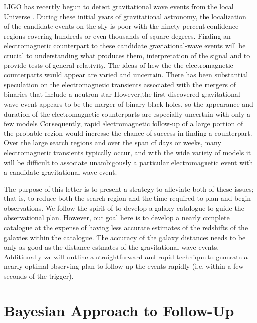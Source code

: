 \documentclass[useAMS,usenatbib]{mn2e}
\begin{document}
LIGO has recently begun to detect gravitational wave events from the
local Universe \citep{PhysRevLett.116.061102}.  During these initial
years of gravitational astronomy, the localization of the candidate
events on the sky is poor with the ninety-percent confidence regions
covering hundreds or even thousands of square degrees.  Finding an
electromagnetic counterpart to these candidate graviational-wave
events will be crucial to understanding what produces them,
interpretation of the signal and to provide tests of general
relativity.  The ideas of how the the electromagnetic counterparts
would appear are varied and uncertain. There has been substantial
speculation on the electromagnetic transients associated with the
mergers of binaries that include a neutron star
\citep[e.g.][]{2016PhRvD..93b4011E,2016arXiv160107711K,2016arXiv160100017D,2015arXiv151205435F,2015ApJ...814L..20M,2015PhRvD..92d4028K,2015arXiv150807939S,2015arXiv150807911S}
However,the first discovered gravitational wave event appears to be
the merger of binary black holes, so the appearance and duration of
the electromagnetic counterparts are especially uncertain with only a few models
\citep[e.g.][]{2015PhRvL.115n1102G,2015MNRAS.452.3419M,2016MNRAS.457..939C,2016ApJ...817..183Y}
Consequently, rapid electromagnetic follow-up of a large portion of
the probable region would increase the chance of success in finding a
counterpart.  Over the large search regions and over the span of days
or weeks, many electromagnetic transients typically occur, and with
the wide variety of models it will be difficult to associate
unambigously a particular electromagnetic event with a candidate
gravitational-wave event.

The purpose of this letter is to present a strategy to alleviate both
of these issues; that is, to reduce both the search region and the
time required to plan and begin observations.  We follow the spirit of
\citet{2015arXiv150803608G} to develop a galaxy catalogue to guide the
observational plan.  However, our goal here is to develop a nearly
complete catalogue at the expense of having less accurate estimates of
the redshifts of the galaxies within the catalogue.  The accuracy of
the galaxy distances needs to be only as good as the distance estmates
of the gravitational-wave events.  Additionally we will outline a
straightforward and rapid technique to generate a nearly optimal
observing plan to follow up the events rapidly (i.e. within a few
seconds of the trigger). 

\section{Bayesian Approach to Follow-Up}
\end{document}
